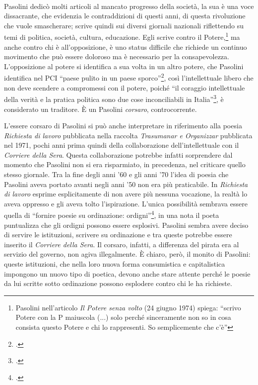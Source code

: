\paragraph{}Pasolini dedicò molti articoli al mancato progresso della società, la sua è una voce dissacrante, che evidenzia le contraddizioni di questi anni, di questa rivoluzione che vuole smascherare; scrive quindi sui diversi giornali nazionali riflettendo su temi di politica, società, cultura, educazione.
Egli scrive contro il Potere,\footnote{Pasolini nell'articolo \textit{Il Potere senza volto} (24 giugno 1974) spiega: \enquote{scrivo Potere con la P maiuscola (...) solo perché sinceramente non so in cosa consista questo Potere e chi lo rappresenti. So semplicemente che c’è}} ma anche contro chi è all'opposizione, è uno status difficile che richiede un continuo movimento che può essere doloroso ma è necessario per la consapevolezza.
L'opposizione al potere si identifica a sua volta in un altro potere, che Pasolini identifica nel PCI \enquote{paese pulito in un paese sporco}\footcite{Scritti5}, così l'intellettuale libero che non deve scendere a compromessi con il potere, poiché \enquote{il coraggio intellettuale della verità e la pratica politica sono due cose inconciliabili in Italia}\footcite{Scritti5}, è considerato un traditore.
È un Pasolini \textit{corsaro}, controcorrente.

L'essere corsaro di Pasolini si può anche interpretare in riferimento alla poesia \textit{Richiesta di lavoro} pubblicata nella raccolta \textit{Trasumanar e Organizzar} pubblicata nel 1971, pochi anni prima quindi della collaborazione dell'intellettuale con il \textit{Corriere della Sera}.
Questa collaborazione potrebbe infatti sorprendere dal momento che Pasolini non si  era risparmiato, in precedenza, nel criticare quello stesso giornale.
Tra la fine degli anni '60 e gli anni '70 l'idea di poesia che Pasolini aveva portato avanti negli anni '50 non era più praticabile.
In \textit{Richiesta di lavoro} esprime esplicitamente di non avere più nessuna vocazione, la realtà lo aveva oppresso e gli aveva tolto l'ispirazione.
L'unica possibilità sembrava essere quella di \enquote{fornire poesie su ordinazione: ordigni}\footcite{Richiesta}, in una nota il poeta puntualizza che gli ordigni possono essere esplosivi.
Pasolini sembra avere deciso di servire le istituzioni, scrivere su ordinazione e tra queste potrebbe essere inserito il \textit{Corriere della Sera}.
Il corsaro, infatti, a differenza del pirata era al servizio del governo, non agiva illegalmente.
È chiaro, però, il monito di Pasolini: queste istituzioni, che nella loro nuova forma consumistica e capitalistica impongono un nuovo tipo di poetica, devono anche stare attente perché le poesie da lui scritte sotto ordinazione possono esplodere contro chi le ha richieste.

